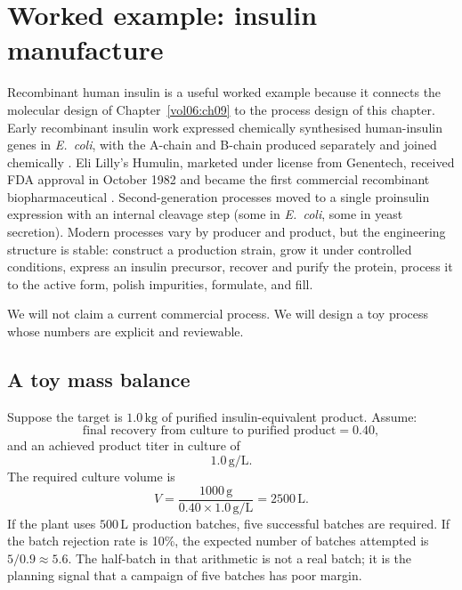 \section{Worked example: insulin manufacture}
\label{sec:vol06ch10:insulin}

Recombinant human insulin is a useful worked example because it connects
the molecular design of Chapter~\ref{vol06:ch09} to the process design
of this chapter. Early recombinant insulin work expressed chemically
synthesised human-insulin genes in \emph{E.\ coli}, with the A-chain and
B-chain produced separately and joined chemically
\cite{paper:v6c10-goeddel-insulin-1979}. Eli Lilly's Humulin, marketed
under license from Genentech, received FDA approval in October 1982 and
became the first commercial recombinant biopharmaceutical
\cite{paper:v6c10-humulin-eli-lilly-1982,
paper:v6c10-rader-biopharma-stats-2008}. Second-generation processes
moved to a single proinsulin expression with an internal cleavage step
(some in \emph{E.\ coli}, some in yeast secretion). Modern processes
vary by producer and product, but the engineering structure is stable:
construct a production strain, grow it under controlled conditions,
express an insulin precursor, recover and purify the protein, process
it to the active form, polish impurities, formulate, and fill.



We will not claim a current commercial process. We will design a toy
process whose numbers are explicit and reviewable.

\subsection{A toy mass balance}

Suppose the target is $1.0\,\text{kg}$ of purified insulin-equivalent
product. Assume:
\[
\text{final recovery from culture to purified product} = 0.40,
\]
and an achieved product titer in culture of
\[
1.0\,\text{g}/\text{L}.
\]
The required culture volume is
\[
V = \frac{1000\,\text{g}}{0.40 \times 1.0\,\text{g}/\text{L}}
= 2500\,\text{L}.
\]
If the plant uses $500\,\text{L}$ production batches, five successful
batches are required. If the batch rejection rate is 10\%, the expected
number of batches attempted is $5/0.9 \approx 5.6$. The half-batch in
that arithmetic is not a real batch; it is the planning signal that a
campaign of five batches has poor margin.

